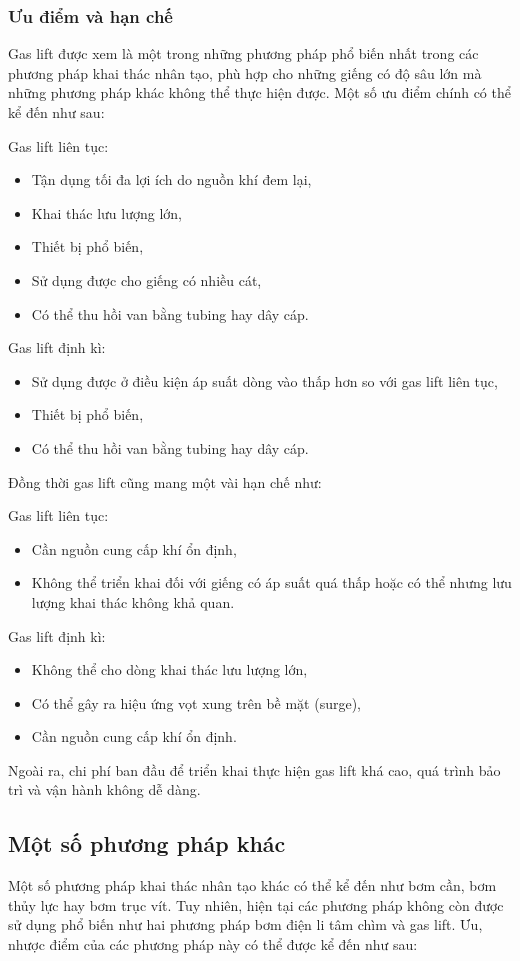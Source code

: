 \documentclass[12pt,a4paper]{report}
\begin{document}
\subsubsection{Ưu điểm và hạn chế}
Gas lift được xem là một trong những phương pháp phổ biến nhất trong các phương pháp khai thác nhân tạo, phù hợp cho những giếng có độ sâu lớn mà những phương pháp khác không thể thực hiện được. Một số ưu điểm chính có thể kể đến như sau:

Gas lift liên tục:
	\begin{itemize}
		\item Tận dụng tối đa lợi ích do nguồn khí đem lại,
		\item Khai thác lưu lượng lớn,
		\item Thiết bị phổ biến,
		\item Sử dụng được cho giếng có nhiều cát,
		\item Có thể thu hồi van bằng tubing hay dây cáp.
	\end{itemize}
Gas lift định kì:
	\begin{itemize}
		\item Sử dụng được ở điều kiện áp suất dòng vào thấp hơn so với gas lift liên tục,
		\item Thiết bị phổ biến,
		\item Có thể thu hồi van bằng tubing hay dây cáp.
	\end{itemize}

Đồng thời gas lift cũng mang một vài hạn chế như:

Gas lift liên tục:
	\begin{itemize}
		\item Cần nguồn cung cấp khí ổn định,
		\item Không thể triển khai đối với giếng có áp suất quá thấp hoặc có thể nhưng lưu lượng khai thác không khả quan.
	\end{itemize}
Gas lift định kì:
	\begin{itemize}
		\item Không thể cho dòng khai thác lưu lượng lớn,
		\item Có thể gây ra hiệu ứng vọt xung trên bề mặt (surge),
		\item Cần nguồn cung cấp khí ổn định.
	\end{itemize}
Ngoài ra, chi phí ban đầu để triển khai thực hiện gas lift khá cao, quá trình bảo trì và vận hành không dễ dàng.\\

\subsection{Một số phương pháp khác}
Một số phương pháp khai thác nhân tạo khác có thể kể đến như bơm cần, bơm thủy lực hay bơm trục vít. Tuy nhiên, hiện tại các phương pháp không còn được sử dụng phổ biến như hai phương pháp bơm điện li tâm chìm và gas lift. Ưu, nhược điểm của các phương pháp này có thể được kể đến như sau:
\end{document}
